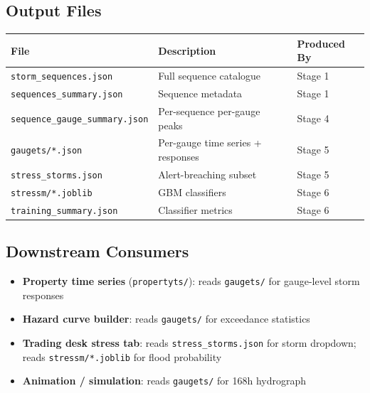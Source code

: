 \documentclass[11pt,a4paper]{article}
\begin{document}
\subsection{Output Files}

\begin{center}
\begin{tabular}{lp{5cm}l}
\toprule
\textbf{File} & \textbf{Description} & \textbf{Produced By} \\
\midrule
\texttt{storm\_sequences.json} & Full sequence catalogue & Stage 1 \\
\texttt{sequences\_summary.json} & Sequence metadata & Stage 1 \\
\texttt{sequence\_gauge\_summary.json} & Per-sequence per-gauge peaks & Stage 4 \\
\texttt{gaugets/*.json} & Per-gauge time series + responses & Stage 5 \\
\texttt{stress\_storms.json} & Alert-breaching subset & Stage 5 \\
\texttt{stressm/*.joblib} & GBM classifiers & Stage 6 \\
\texttt{training\_summary.json} & Classifier metrics & Stage 6 \\
\bottomrule
\end{tabular}
\end{center}

\subsection{Downstream Consumers}

\begin{itemize}[nosep]
    \item \textbf{Property time series} (\texttt{propertyts/}): reads \texttt{gaugets/}
          for gauge-level storm responses
    \item \textbf{Hazard curve builder}: reads \texttt{gaugets/} for exceedance statistics
    \item \textbf{Trading desk stress tab}: reads \texttt{stress\_storms.json} for
          storm dropdown; reads \texttt{stressm/*.joblib} for flood probability
    \item \textbf{Animation / simulation}: reads \texttt{gaugets/} for 168h hydrograph
\end{itemize}

\mkmsensitivity
\end{document}
